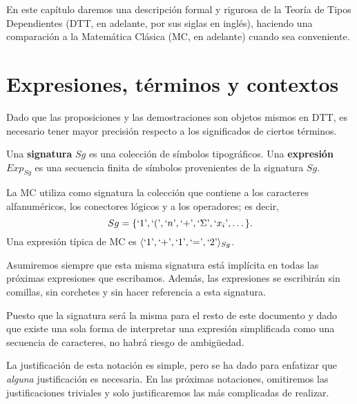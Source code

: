 \documentclass[../main.tex]{subfiles}
\begin{document}
En este cap\'itulo daremos una descripción formal y rigurosa de la Teoría de Tipos Dependientes (DTT, en adelante, por sus siglas en inglés), haciendo una comparación a la Matemática Clásica (MC, en adelante) cuando sea conveniente.

\section{Expresiones, términos y contextos}
Dado que las proposiciones y las demostraciones son objetos mismos en DTT, es necesario tener mayor precisión respecto a los significados de ciertos términos.
\begin{definition}
    Una \textbf{signatura} $Sg$ es una colección de símbolos tipográficos. Una \textbf{expresión} $Exp_{Sg}$ es una secuencia finita de símbolos provenientes de la signatura $Sg$.
\end{definition}
\begin{example}
    La MC utiliza como signatura la colección que contiene a los caracteres alfanuméricos, los conectores lógicos y a los operadores; es decir,
    \[Sg=\{\textrm`1\textrm',\textrm`(\textrm',\textrm`n\textrm',\textrm`{+}\textrm',\textrm`\Sigma\textrm',\textrm`x_i\textrm',\dots\}.\]
    Una expresión típica de MC es $\langle \textrm`1\textrm', \textrm`{+}\textrm', \textrm`1\textrm', \textrm`{=}\textrm', \textrm`2\textrm' \rangle_{Sg}$.
\end{example}
\begin{notation}
    Asumiremos siempre que esta misma signatura está implícita en todas las próximas expresiones que escribamos. Además, las expresiones se escribirán sin comillas, sin corchetes y sin hacer referencia a esta signatura.
\end{notation}
\begin{justification}
    Puesto que la signatura será la misma para el resto de este documento y dado que existe una sola forma de interpretar una expresión simplificada
    como una secuencia de caracteres, no habrá riesgo de ambigüedad.
\end{justification}

La justificación de esta notación es simple, pero se ha dado para enfatizar que \textit{alguna} justificación es necesaria. En las próximas notaciones, omitiremos las justificaciones triviales y solo justificaremos las más complicadas de realizar.
\end{document}

